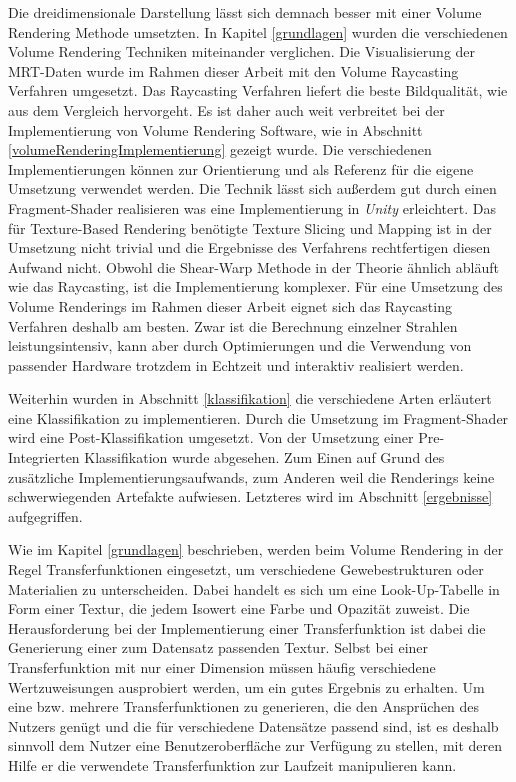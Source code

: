 Die dreidimensionale Darstellung lässt sich demnach besser mit einer Volume Rendering Methode umsetzten.  
In Kapitel \ref{grundlagen} wurden die verschiedenen Volume Rendering Techniken miteinander verglichen.
Die Visualisierung der MRT-Daten wurde im Rahmen dieser Arbeit mit den Volume Raycasting Verfahren umgesetzt.
Das Raycasting Verfahren liefert die beste Bildqualität, wie aus dem Vergleich hervorgeht. Es ist daher auch weit verbreitet bei der Implementierung von Volume Rendering Software, wie in Abschnitt \ref{volumeRenderingImplementierung} gezeigt wurde. 
Die verschiedenen Implementierungen können zur Orientierung und als Referenz für die eigene Umsetzung verwendet werden.
Die Technik lässt sich außerdem gut durch einen Fragment-Shader realisieren was eine Implementierung in \textit{Unity} erleichtert. 
Das für Texture-Based Rendering benötigte Texture Slicing und Mapping ist in der Umsetzung nicht trivial und die Ergebnisse des Verfahrens rechtfertigen diesen Aufwand nicht.
Obwohl die Shear-Warp Methode in der Theorie ähnlich abläuft wie das Raycasting, ist die Implementierung komplexer.
Für eine Umsetzung des Volume Renderings im Rahmen dieser Arbeit eignet sich das Raycasting Verfahren deshalb am besten.
Zwar ist die Berechnung einzelner Strahlen leistungsintensiv, kann aber durch Optimierungen und die Verwendung von passender Hardware trotzdem in Echtzeit und interaktiv realisiert werden.

Weiterhin wurden in Abschnitt \ref{klassifikation} die verschiedene Arten erläutert eine Klassifikation zu implementieren. Durch die Umsetzung im Fragment-Shader wird eine Post-Klassifikation umgesetzt. 
Von der Umsetzung einer Pre-Integrierten Klassifikation wurde abgesehen. Zum Einen auf Grund des zusätzliche Implementierungsaufwands, zum Anderen weil die Renderings keine schwerwiegenden Artefakte aufwiesen. Letzteres wird im Abschnitt \ref{ergebnisse} aufgegriffen.

Wie im Kapitel \ref{grundlagen} beschrieben, werden beim Volume Rendering in der Regel Transferfunktionen eingesetzt, um verschiedene Gewebestrukturen oder Materialien zu unterscheiden. Dabei handelt es sich um eine Look-Up-Tabelle in Form einer Textur, die jedem Isowert eine Farbe und Opazität zuweist.
Die Herausforderung bei der Implementierung einer Transferfunktion ist dabei die Generierung einer zum Datensatz passenden Textur. Selbst bei einer Transferfunktion mit nur einer Dimension müssen häufig verschiedene Wertzuweisungen ausprobiert werden, um ein gutes Ergebnis zu erhalten.
Um eine bzw. mehrere Transferfunktionen zu generieren, die den Ansprüchen des Nutzers genügt und die für verschiedene Datensätze passend sind, ist es deshalb sinnvoll dem Nutzer eine Benutzeroberfläche zur Verfügung zu stellen, mit deren Hilfe er die verwendete Transferfunktion zur Laufzeit manipulieren kann. 

